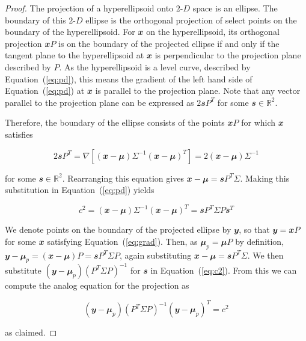 \documentclass[
  12pt,
]{interact}
\newcommand\gD{$2\text{-}D$}
\begin{document}
\begin{proof}
The projection of a hyperellipsoid onto \gD{} space is an ellipse. The boundary of this \gD{} ellipse is the orthogonal projection of select points on the boundary of the hyperellipsoid. For $\mathbfit{x}$ on the hyperellipsoid, its orthogonal projection $\mathbfit{x}P$ is on the boundary of the projected ellipse if and only if the tangent plane to the hyperellipsoid at $\mathbfit{x}$ is perpendicular to the projection plane described by $P$. As the hyperellipsoid is a level curve, described by Equation~(\ref{eq:pd}), this means the gradient of the left hand side of Equation~(\ref{eq:pd}) at $\mathbfit{x}$ is parallel to the projection plane. Note that any vector parallel to the projection plane can be expressed as $2\mathbfit{s}P^T$ for some $\mathbfit{s} \in \mathbb{R}^2$.

Therefore, the boundary of the ellipse consists of the points $\mathbfit{x}P$ for which $\mathbfit{x}$ satisfies

\begin{equation}
2\mathbfit{s}P^T = \nabla \left[(\mathbfit{x}-\mathbfit{\mu}) \Sigma^{-1}(\mathbfit{x}-\mathbfit{\mu})^T\right] = 2 (\mathbfit{x}-\mathbfit{\mu}) \Sigma^{-1}
\label{eq:grad}
\end{equation}

for some $\mathbfit{s} \in \mathbb{R}^2$. Rearranging this equation gives $\mathbfit{x}-\mathbfit{\mu} = \mathbfit{s} P^T \Sigma$.
Making this substitution in Equation~(\ref{eq:pd}) yields

\begin{equation}
c^2 = (\mathbfit{x}-\mathbfit{\mu}) \Sigma^{-1}(\mathbfit{x}-\mathbfit{\mu})^T = \mathbfit{s} P^T \Sigma P \mathbfit{s}^T
\label{eq:c2}
\end{equation}

We denote points on the boundary of the projected ellipse by $\mathbfit{y}$, so that $\mathbfit{y} = \mathbfit{x}P$ for some $\mathbfit{x}$ satisfying Equation~(\ref{eq:grad}). Then, as $\mathbfit{\mu}_p = \mathbfit{\mu} P$ by definition, $\mathbfit{y} - \mathbfit{\mu}_p = (\mathbfit{x} - \mathbfit{\mu})P = \mathbfit{s} P^T \Sigma P$, again substituting $\mathbfit{x}-\mathbfit{\mu} = \mathbfit{s} P^T \Sigma$. We then substitute $(\mathbfit{y} - \mathbfit{\mu}_p) (P^T \Sigma P)^{-1}$ for $\mathbfit{s}$ in Equation~(\ref{eq:c2}). From this we can compute the analog equation for the projection as

\begin{equation}
(\mathbfit{y} - \mathbfit{\mu}_p)(P^T \Sigma P)^{-1}(\mathbfit{y} - \mathbfit{\mu}_p)^T = c^2
\end{equation}

as claimed.
\end{proof}
\end{document}

